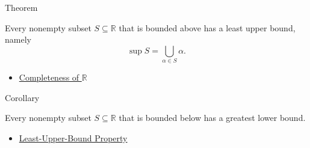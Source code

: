 \begin{theorembox}{Theorem}
\begin{theorem}
\label{thm:lub-property-r}
Every nonempty subset $S\subseteq\mathbb{R}$ that is bounded above has a least
upper bound, namely
\[
\sup S=\bigcup_{\alpha\in S}\alpha.
\]
\end{theorem}
\end{theorembox}

\begin{dependencies}
\begin{itemize}
  \item \hyperref[ax:completeness-of-reals]{Completeness of $\mathbb{R}$}
\end{itemize}
\end{dependencies}

\begin{corollarybox}{Corollary}
\begin{corollary}
\label{cor:glb-property-r}
Every nonempty subset $S\subseteq\mathbb{R}$ that is bounded below has a
greatest lower bound.
\end{corollary}
\end{corollarybox}

\begin{dependencies}
\begin{itemize}
  \item \hyperref[thm:lub-property-r]{Least-Upper-Bound Property}
\end{itemize}
\end{dependencies}

